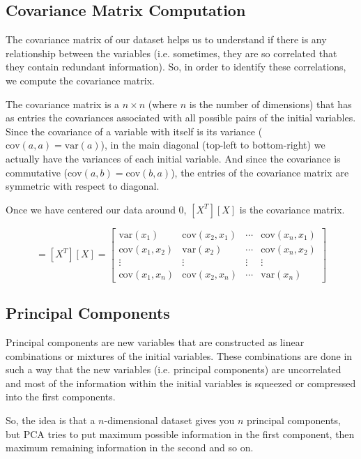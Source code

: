 \subsection{Covariance Matrix Computation}
The covariance matrix of our dataset helps us to understand if there is any relationship between the variables (i.e. sometimes, they are so correlated that they contain redundant information). So, in order to identify these correlations, we compute the covariance matrix.

The covariance matrix is a $n\times n$ (where $n$ is the number of dimensions) that has as entries the covariances associated with all possible pairs of the initial variables. Since the covariance of a variable with itself is its variance ($\textrm{cov}(a, a)= \textrm{var}(a)$), in the main diagonal (top-left to bottom-right) we actually have the variances of each initial variable. And since the covariance is commutative ($\textrm{cov}(a, b) = \textrm{cov}(b, a)$), the entries of the covariance matrix are symmetric with respect to diagonal.

Once we have centered our data around 0, $[X^T][X]$ is the covariance matrix.

\begin{equation}
[\Sigma]=[X^T][X] =
\begin{bmatrix}
\textrm{var}(x_1) & \textrm{cov}(x_2, x_1) & \cdots & \textrm{cov}(x_n, x_1) \\
\textrm{cov}(x_1, x_2) & \textrm{var}(x_2) & \cdots & \textrm{cov}(x_n, x_2) \\
\vdots & \vdots & \vdots & \vdots \\
\textrm{cov}(x_1, x_n) & \textrm{cov}(x_2, x_n) & \cdots & \textrm{var}(x_n)
\end{bmatrix}
\end{equation}

\subsection{Principal Components}

Principal components are new variables that are constructed as linear combinations or mixtures of the initial variables. These combinations are done in such a way that the new variables (i.e. principal components) are uncorrelated and most of the information within the initial variables is squeezed or compressed into the first components. 

So, the idea is that a $n$-dimensional dataset gives you $n$ principal components, but PCA tries to put maximum possible information in the first component, then maximum remaining information in the second and so on.

